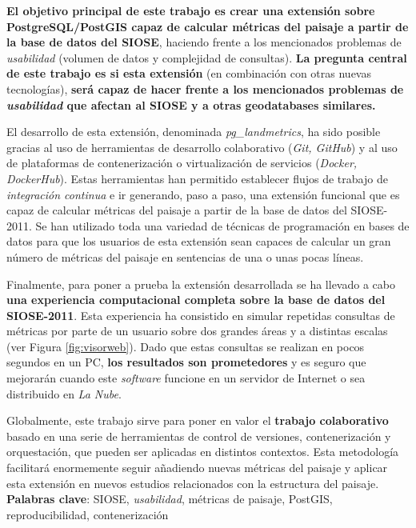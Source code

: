 \begin{resumen}
\textbf{El objetivo principal de este trabajo es crear una extensión sobre PostgreSQL/PostGIS capaz de calcular métricas del paisaje a partir de la base de datos del SIOSE}, haciendo frente a los mencionados problemas de \textit{usabilidad} (volumen de datos y complejidad de consultas). \textbf{La pregunta central de este trabajo es si esta extensión} (en combinación con otras nuevas tecnologías), \textbf{será capaz de hacer frente a los mencionados problemas de \textit{usabilidad} que afectan al SIOSE y a otras geodatabases similares.}

El desarrollo de esta extensión, denominada \textit{pg\_landmetrics}, ha sido posible gracias al uso de herramientas de desarrollo colaborativo (\textit{Git, GitHub}) y al uso de plataformas de contenerización o virtualización de servicios (\textit{Docker, DockerHub}). Estas herramientas han permitido establecer flujos de trabajo de \textit{integración continua} e ir generando, paso a paso, una extensión funcional que es capaz de calcular métricas del paisaje a partir de la base de datos del SIOSE-2011. Se han utilizado toda una variedad de técnicas de programación en bases de datos para que los usuarios de esta extensión sean capaces de calcular un gran número de métricas del paisaje en sentencias de una o unas pocas líneas.

Finalmente, para poner a prueba la extensión desarrollada se ha llevado a cabo \textbf{una experiencia computacional completa sobre la base de datos del SIOSE-2011}. Esta experiencia ha consistido en simular repetidas consultas de métricas por parte de un usuario sobre dos grandes áreas y a distintas escalas (ver Figura \ref{fig:visorweb}). Dado que estas consultas se realizan en pocos segundos en un PC, \textbf{los resultados son prometedores} y es seguro que mejorarán cuando este \textit{software} funcione en un servidor de Internet o sea distribuido en \textit{La Nube}.

Globalmente, este trabajo sirve para poner en valor el \textbf{trabajo colaborativo} basado en una serie de herramientas de control de versiones, contenerización y orquestación, que pueden ser aplicadas en distintos contextos. Esta metodología facilitará enormemente seguir añadiendo nuevas métricas del paisaje y aplicar esta extensión en nuevos estudios relacionados con la estructura del paisaje.\\


\textbf{Palabras clave}: SIOSE, \textit{usabilidad}, métricas de paisaje, PostGIS, reproducibilidad, contenerización


\end{resumen}

